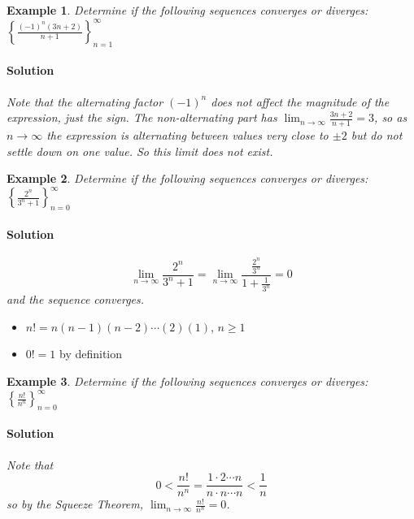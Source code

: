 \documentclass[letterpaper, 11pt, openany]{book}
\theoremstyle{mytheoremstyle}
\theoremstyle{myexamplestyle}
\newtheorem{example}{Example}[section]
\newenvironment{solution}{\paragraph{\sffamily \smaller \fontseries{b}\selectfont Solution}}{\hfill\faSquare}
\begin{document}
\begin{example}\label{e:seq-alternating-limit}
    Determine if the following sequences converges or diverges: \(\displaystyle \left\{ \frac{(-1)^{n}(3n+2)}{n+1}\right\}_{n = 1}^{\infty}\)
    \begin{solution}
        Note that the alternating factor \((-1)^{n}\) does not affect the magnitude of the expression, just the sign. The non-alternating part has \(\displaystyle \lim_{n\to \infty} \frac{3n+2}{n+1} = 3\), so as \(n\to \infty\) the expression is alternating between values very close to \(\pm 2\) but do not settle down on one value. So this limit does not exist.
    \end{solution}
\end{example}

\begin{example}\label{e:seqexp}
    Determine if the following sequences converges or diverges: $\displaystyle \left\{ \frac{2^{n}}{3^{n} + 1} \right\}_{n = 0}^{\infty}$
    
    \begin{solution}
        \[\lim_{n \to \infty}\frac{2^{n}}{3^{n} + 1} = \lim_{n \to \infty}\frac{\frac{2^{n}}{3^{n}}}{1 + \frac{1}{3^{n}}} = 0\]
        and the sequence converges.
    \end{solution}
\end{example}

\begin{itemize}
    \item $n! = n(n-1)(n-2)\cdots (2)(1)$, $n \geq 1$
    \item $0! = 1$ by definition
\end{itemize}

\begin{example}\label{e:seqfac}
    Determine if the following sequences converges or diverges: $\displaystyle \left\{ \frac{n!}{n^{n}} \right\}_{n = 0}^{\infty}$
    
    \begin{solution}
        Note that
        \[0 < \frac{n!}{n^{n}} = \frac{1\cdot 2 \cdots n}{n \cdot n \cdots n} < \frac{1}{n}\]
        so by the Squeeze Theorem, $\displaystyle \lim_{n \to \infty}\frac{n!}{n^{n}} = 0$.
    \end{solution}
\end{example}
\end{document}
